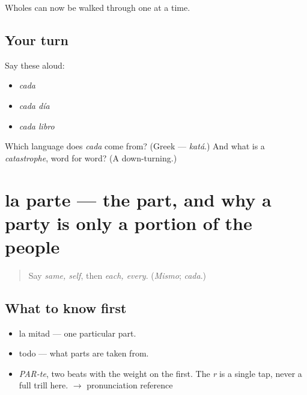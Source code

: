 \begin{grammarlens}[title={What you've built}]
Wholes can now be walked through one at a time.
\end{grammarlens}

\subsection*{Your turn}
Say these aloud:

\begin{itemize}
\raggedright
  \item \emph{cada}
  \item \emph{cada día}
  \item \emph{cada libro}
\end{itemize}

\begin{tcolorbox}[breakable,colback=teal!4,colframe=teal!35!black,title={Before you move on}]
Which language does \emph{cada} come from? (Greek — \emph{katá}.) And what is a \emph{catastrophe}, word for word? (A down-turning.)
\end{tcolorbox}
\section[la parte]{la parte — the part, and why a party is only a portion of the people}

\label{lesson:ES-C345-parte}



\begin{quote}
Say \emph{same, self}, then \emph{each, every}. (\emph{Mismo}; \emph{cada}.)
\end{quote}

\subsection*{What to know first}
\begin{itemize}
\raggedright
  \item la mitad — one particular part.
  \item todo — what parts are taken from.
\end{itemize}

\begin{sounds}
\begin{itemize}
\raggedright
  \item \emph{PAR-te}, two beats with the weight on the first. The \emph{r} is a single tap, never a full trill here. $\to$ pronunciation reference
\end{itemize}
\end{sounds}

